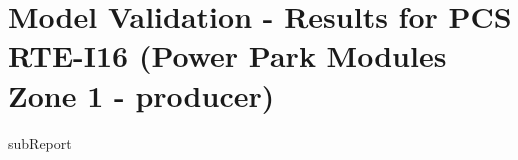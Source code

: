 




    \section{Model Validation - Results for PCS RTE-I16 (Power Park Modules Zone 1 - {{producer}})}

    {{subReport}}
    \newpage

